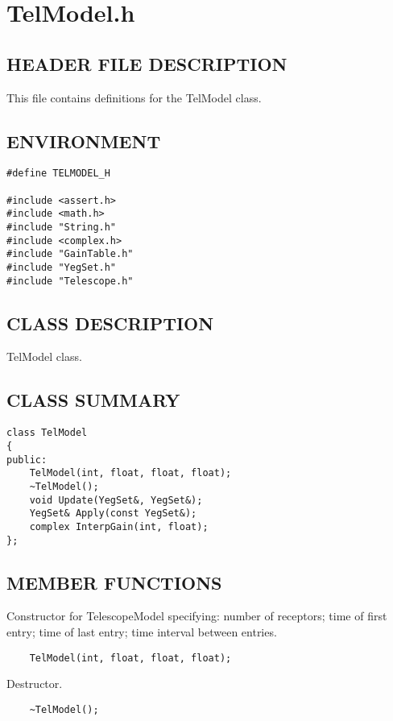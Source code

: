 \clearpage
\section{TelModel.h}

\subsection*{HEADER FILE DESCRIPTION}
 This file contains definitions for the TelModel class.
  
\subsection*{ENVIRONMENT}
\begin{verbatim}
#define TELMODEL_H

#include <assert.h>
#include <math.h>
#include "String.h"
#include <complex.h>
#include "GainTable.h"
#include "YegSet.h"
#include "Telescope.h"
\end{verbatim}

\subsection*{CLASS DESCRIPTION}
 TelModel class.

\subsection*{CLASS SUMMARY}
\begin{verbatim}
class TelModel
{
public:
    TelModel(int, float, float, float);
    ~TelModel();
    void Update(YegSet&, YegSet&);
    YegSet& Apply(const YegSet&);
    complex InterpGain(int, float);
};
\end{verbatim}

\subsection*{MEMBER FUNCTIONS}
      
       Constructor for TelescopeModel specifying:
         number of receptors;
         time of first entry;
         time of last entry;
         time interval between entries.
\begin{verbatim}
    TelModel(int, float, float, float);
\end{verbatim}

       Destructor.
\begin{verbatim}
    ~TelModel();
\end{verbatim}

